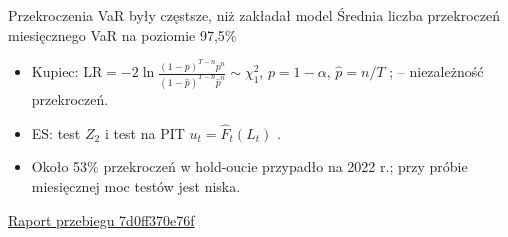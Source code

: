 \documentclass[aspectratio=169,11pt]{beamer}
\newcommand{\repo}{https://github.com/michalmarchwiak/bsc-project}
\newcommand{\rev}{9e941db56fde866672b262f5f6725268ce58feb7}
\newcommand{\src}[2]{\vfill{\scriptsize\color{Teal}%
  \href{\repo/blob/\rev/#1}{#2}}}
\begin{document}
\begin{frame}{Przekroczenia VaR były częstsze, niż zakładał model}
  \centering
  {\small Średnia liczba przekroczeń miesięcznego VaR
    na poziomie 97,5\%}\par\medskip
  \raggedright\medskip
  \begin{itemize}
    \item Kupiec: \(\mathrm{LR}=-2\ln\frac{(1-p)^{T-n}p^{n}}
      {(1-\hat p)^{T-n}\hat p^{n}}\sim\chi^2_1\), \(p=1-\alpha\),
      \(\hat p=n/T\) \citep{kupiec1995}; \citet{christoffersen1998}
      -- niezależność przekroczeń.
    \item ES: test \(Z_2\) \citep{acerbi2014} i test na PIT
      \(u_t=\hat F_t(L_t)\) \citep{du2017}.
    \item Około 53\% przekroczeń w hold-oucie przypadło na 2022 r.;
      przy próbie miesięcznej moc testów jest niska.
  \end{itemize}
  \src{artifacts/reports/backtest_summary.md}{Raport przebiegu 7d0ff370e76f}
\end{frame}
\end{document}
